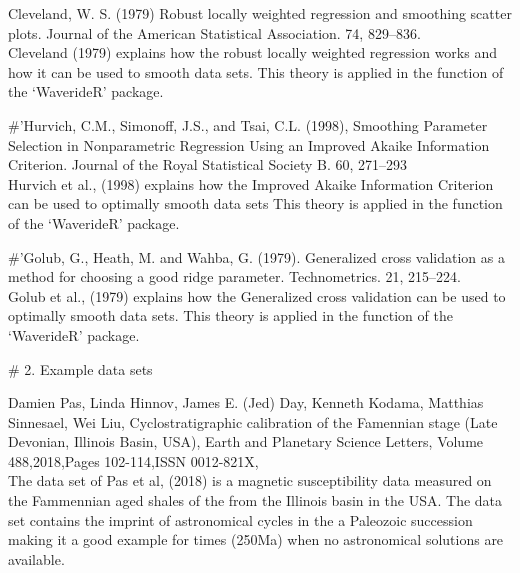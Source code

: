 \documentclass[a4paper]{book}
\begin{document}
\begin{References}
Cleveland, W. S. (1979) Robust locally weighted regression and smoothing scatter plots.
Journal of the American Statistical Association. 74, 829–836.  \\{}
Cleveland (1979) explains how the robust locally weighted regression works
and how it can be used to smooth data sets. This theory is applied in the
 function of the ‘WaverideR’ package.

\#'Hurvich, C.M., Simonoff, J.S., and Tsai, C.L. (1998), Smoothing Parameter
Selection in Nonparametric Regression Using an Improved Akaike Information
Criterion. Journal of the Royal Statistical Society B. 60, 271–293
 \\{}
Hurvich et al., (1998) explains how
the Improved Akaike Information Criterion can be used to optimally smooth data sets
This theory is applied in the  function of the ‘WaverideR’ package.

\#'Golub, G., Heath, M. and Wahba, G. (1979). Generalized cross validation as
a method for choosing a good ridge parameter. Technometrics. 21, 215–224. \\{}
Golub et al., (1979) explains how the Generalized cross validation can be
used to optimally smooth data sets. This theory is applied in the 
function of the ‘WaverideR’ package.

\# 2. Example data sets

Damien Pas, Linda Hinnov, James E. (Jed) Day, Kenneth Kodama, Matthias Sinnesael, Wei Liu,
Cyclostratigraphic calibration of the Famennian stage (Late Devonian, Illinois Basin, USA),
Earth and Planetary Science Letters,
Volume 488,2018,Pages 102-114,ISSN 0012-821X,
 \\{}
The data set of Pas et al, (2018) is a
magnetic susceptibility data measured on the Fammennian aged shales of
the from the Illinois basin in the USA. The data set contains the imprint of
astronomical cycles in the a Paleozoic succession making it a good example for
times (250Ma) when no astronomical solutions are available.



\end{References}
\end{document}
